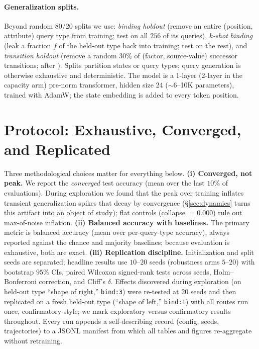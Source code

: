 \documentclass[10pt]{article} %
\begin{document}
\paragraph{Generalization splits.} Beyond random $80/20$ splits we use: \emph{binding holdout}
(remove an entire (position, attribute) query type from training; test on all $256$ of its
queries), \emph{$k$-shot binding} (leak a fraction $f$ of the held-out type back into training;
test on the rest), and \emph{transition holdout} (remove a random $30\%$ of (factor, source-value)
successor transitions; after \citealp{hu2024case}). Splits partition states or query types; query
generation is otherwise exhaustive and deterministic. The model is a 1-layer (2-layer in the
capacity arm) pre-norm transformer, hidden size $24$ ($\sim$6--10K parameters), trained with AdamW;
the state embedding is added to every token position.

\section{Protocol: Exhaustive, Converged, and Replicated}
\label{sec:protocol}
Three methodological choices matter for everything below. \textbf{(i) Converged, not peak.} We
report the \emph{converged} test accuracy (mean over the last $10\%$ of evaluations). During
exploration we found that the peak over training inflates transient generalization spikes that
decay by convergence (\S\ref{sec:dynamics} turns this artifact into an object of study); flat
controls (collapse $= 0.000$) rule out max-of-noise inflation. \textbf{(ii) Balanced accuracy with
baselines.} The primary metric is balanced accuracy (mean over per-query-type accuracy), always
reported against the chance and majority baselines; because evaluation is exhaustive, both are
exact. \textbf{(iii) Replication discipline.} Initialization and split seeds are separated; headline
results use $10$--$20$ seeds (robustness arms $5$--$20$) with bootstrap $95\%$ CIs, paired
Wilcoxon signed-rank tests across seeds, Holm--Bonferroni correction, and Cliff's $\delta$. Effects discovered during exploration (on
held-out type ``shape of right,'' \texttt{bind:3}) were re-tested at 20 seeds and then replicated
on a fresh held-out type (``shape of left,'' \texttt{bind:1}) with all routes run once,
confirmatory-style; we mark exploratory versus confirmatory results throughout. Every run appends
a self-describing record (config, seeds, trajectories) to a JSONL manifest from which all tables
and figures re-aggregate without retraining.
\end{document}
